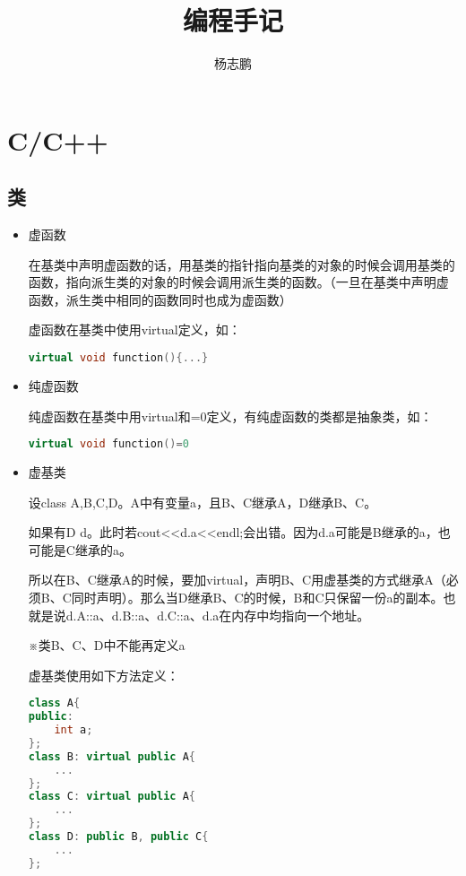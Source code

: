 \documentclass[UTF8]{ctexart}
\title{编程手记}
\author{杨志鹏}
\begin{document}
\maketitle
\pagestyle{fancy}
\tableofcontents
\newpage
\section{C/C++}
\subsection{类}
\begin{itemize}
\item {\LARGE 虚函数}

    在基类中声明虚函数的话，用基类的指针指向基类的对象的时候会调用基类的函数，指向派生类的对象的时候会调用派生类的函数。（一旦在基类中声明虚函数，派生类中相同的函数同时也成为虚函数）

虚函数在基类中使用virtual定义，如：
\begin{lstlisting}[language=C++]
virtual void function(){...}
\end{lstlisting}
\item {\LARGE 纯虚函数}

纯虚函数在基类中用virtual和=0定义，有纯虚函数的类都是抽象类，如：
\begin{lstlisting}[language=C++]
virtual void function()=0
\end{lstlisting}
\item {\LARGE 虚基类}

设class A,B,C,D。A中有变量a，且B、C继承A，D继承B、C。

如果有D d。此时若cout<<d.a<<endl;会出错。因为d.a可能是B继承的a，也可能是C继承的a。

所以在B、C继承A的时候，要加virtual，声明B、C用虚基类的方式继承A（必须B、C同时声明）。那么当D继承B、C的时候，B和C只保留一份a的副本。也就是说d.A::a、d.B::a、d.C::a、d.a在内存中均指向一个地址。

{\color{red}※类B、C、D中不能再定义a}

虚基类使用如下方法定义：
\begin{lstlisting}[language=C++]
class A{
public:
    int a;
};
class B: virtual public A{
    ...
};
class C: virtual public A{
    ...
};
class D: public B, public C{
    ...
};
\end{lstlisting}
\end{itemize}
\end{document}
